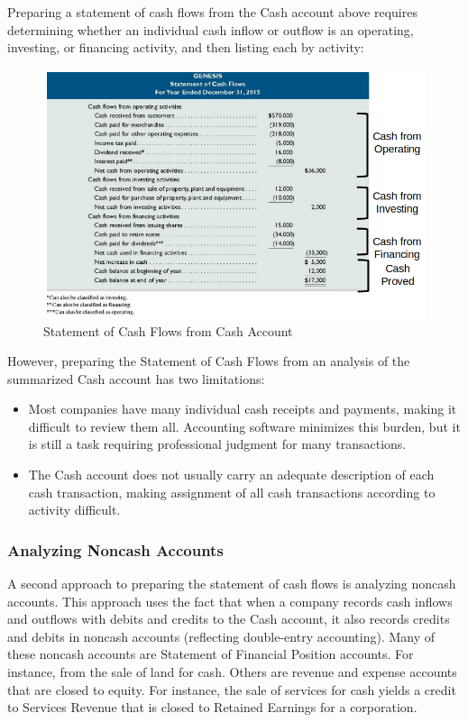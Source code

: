 \documentclass[../main.tex]{subfiles}
\begin{document}
	Preparing a statement of cash flows from the Cash account above requires 
	determining whether an individual cash inflow or outflow is an operating, 
	investing, or financing activity, and then listing each by activity:
	\begin{figure}[ht]
		\centering
		\includegraphics[width=1\columnwidth]{images/c11/from_cash_acc.png}
		\caption{\label{fig:from_cash_account} Statement of Cash Flows from 
		Cash Account}
	\end{figure}

	However, preparing the Statement of Cash Flows from an analysis of the 
	summarized Cash account has two limitations:
	\begin{itemize}[noitemsep]
		\item Most companies have many individual cash receipts and payments, 
		making it difficult to review them all. Accounting software minimizes 
		this burden, but it is still a task requiring professional judgment for 
		many transactions.
		\item The Cash account does not usually carry an adequate description 
		of each cash transaction, making assignment of all cash transactions 
		according to activity difficult.
	\end{itemize}
	
	\subsubsection{Analyzing Noncash Accounts}
	
	A second approach to preparing the statement of cash flows is analyzing 	
	noncash accounts. This approach uses the fact that when a company records 
	cash inflows and outflows with debits and credits to the Cash account, it 
	also records credits and debits in noncash accounts (reflecting 
	double-entry accounting). Many of these noncash accounts are Statement of 
	Financial Position accounts. For instance, from the sale of land for cash. 
	Others are revenue and expense accounts that are closed to equity. For 
	instance, the sale of services for cash yields a credit to Services Revenue 
	that is closed to Retained Earnings for a corporation. 
	
\end{document}
